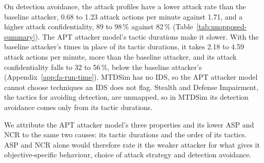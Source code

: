 \documentclass{cshonours}
\begin{document}
On detection avoidance, the attack profiles have a lower attack rate than the
baseline attacker, 0.68 to 1.23 attack actions per minute against 1.71, and a
higher attack confidentiality, 89 to 98\,\% against 82\,\%
(Table~\ref{tab:unopposed-summary}). The APT attacker model's tactic durations
make it slower. With the baseline attacker's times in place of its tactic
durations, it takes 2.18 to 4.59 attack actions per minute, more than the
baseline attacker, and its attack confidentiality falls to 32 to 56\,\%,
below the baseline attacker's (Appendix~\ref{app:fa-run-time}). MTDSim has no
IDS, so the APT attacker model cannot choose techniques an IDS does not flag.
Stealth and Defense Impairment, the tactics for avoiding detection, are
unmapped, so in MTDSim its detection avoidance comes only from its tactic
durations.

We attribute the APT attacker model's three properties and its lower ASP and
NCR to the same two causes: its tactic durations and the order of its tactics.
ASP and NCR alone would therefore rate it the weaker attacker for what gives it
objective-specific behaviour, choice of attack strategy and detection avoidance.
\end{document}

